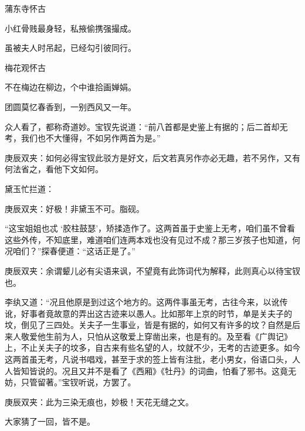 \begin{poem}
    \emptypl
    \begin{pl}蒲东寺怀古　\end{pl}

    \begin{pl}小红骨贱最身轻，私掖偷携强撮成。\end{pl}

    \begin{pl}虽被夫人时吊起，已经勾引彼同行。\end{pl}

    \emptypl
    \begin{pl}梅花观怀古　\end{pl}

    \begin{pl}不在梅边在柳边，个中谁拾画婵娟。\end{pl}

    \begin{pl}团圆莫忆春香到，一别西风又一年。\end{pl}

\end{poem}


\begin{parag}
    众人看了，都称奇道妙。宝钗先说道：“前八首都是史鉴上有据的；后二首却无考，我们也不大懂得，不如另作两首为是。”\begin{note}庚辰双夹：如何必得宝钗此驳方是好文，后文若真另作亦必无趣，若不另作，又有何法省之，看他下文如何。\end{note}黛玉忙拦道：\begin{note}庚辰双夹：好极！非黛玉不可。脂砚。\end{note}“这宝姐姐也忒 ‘胶柱鼓瑟’，矫揉造作了。这两首虽于史鉴上无考，咱们虽不曾看这些外传，不知底里，难道咱们连两本戏也没有见过不成？那三岁孩子也知道，何况咱们？”探春便道：“这话正是了。”\begin{note}庚辰双夹：余谓颦儿必有尖语来讽，不望竟有此饰词代为解释，此则真心以待宝钗也。\end{note}李纨又道：“况且他原是到过这个地方的。这两件事虽无考，古往今来，以讹传讹，好事者竟故意的弄出这古迹来以愚人。比如那年上京的时节，单是关夫子的坟，倒见了三四处。关夫子一生事业，皆是有据的，如何又有许多的坟？自然是后来人敬爱他生前为人，只怕从这敬爱上穿凿出来，也是有的。及至看《广舆记》上，不止关夫子的坟多，自古来有些名望的人，坟就不少，无考的古迹更多。如今这两首虽无考，凡说书唱戏，甚至于求的签上皆有注批，老小男女，俗语口头，人人皆知皆说的。况且又并不是看了《西厢》《牡丹》的词曲，怕看了邪书。这竟无妨，只管留著。”宝钗听说，方罢了。\begin{note}庚辰双夹：此为三染无痕也，妙极！天花无缝之文。\end{note}大家猜了一回，皆不是。
\end{parag}


